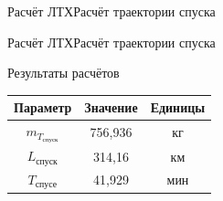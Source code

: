 \begin{frame}{Расчёт ЛТХ}{Расчёт траектории спуска} %
        \begin{minipage}[c]{0.45\textwidth}
        \end{minipage}
        \begin{minipage}[c]{0.45\textwidth}
        \end{minipage}
\end{frame}

\begin{frame}{Расчёт ЛТХ}{Расчёт траектории спуска}
    \begin{block}{Результаты расчётов}
        \begin{table}
            \begin{tabular}{|c|c|c|}
                \hline
                Параметр& Значение & Единицы\\ \hline
                $m_{T_\text{спуск}}$&756,936 & кг\\ \hline
                $L_\text{спуск}$& 314,16 &км \\ \hline
                $T_\text{спусе}$& 41,929 & мин\\ \hline
            \end{tabular}
        \end{table}
    \end{block}
\end{frame}

